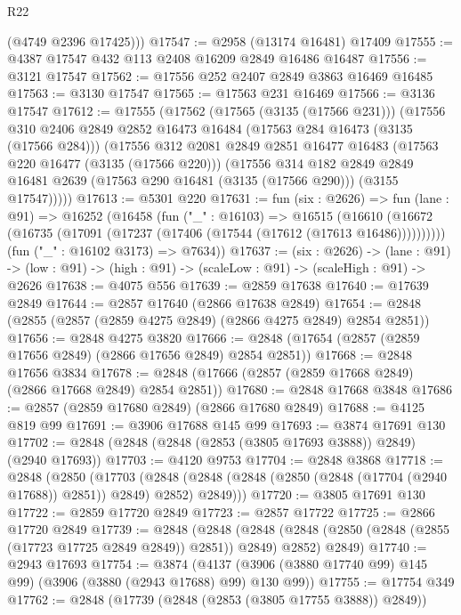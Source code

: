 \begin{lexlean}{R22}
\begin{coremodule}
        (@4749 @2396 @17425)))
@17547 := @2958 (@13174 @16481) @17409
@17555 := @4387 @17547 @432 @113 @2408 @16209 @2849 @16486 @16487
@17556 := @3121 @17547
@17562 := @17556 @252 @2407 @2849 @3863 @16469 @16485
@17563 := @3130 @17547
@17565 := @17563 @231 @16469
@17566 := @3136 @17547
@17612 := @17555
    (@17562
      (@17565 (@3135 (@17566 @231)))
      (@17556
        @310
        @2406
        @2849
        @2852
        @16473
        @16484
        (@17563 @284 @16473 (@3135 (@17566 @284)))
        (@17556
          @312
          @2081
          @2849
          @2851
          @16477
          @16483
          (@17563 @220 @16477 (@3135 (@17566 @220)))
          (@17556
            @314
            @182
            @2849
            @2849
            @16481
            @2639
            (@17563 @290 @16481 (@3135 (@17566 @290)))
            (@3155 @17547)))))
@17613 := @5301 @220
@17631 := fun (six : @2626) =>
  fun (lane : @91) =>
  @16252
    (@16458
      (fun ("_" : @16103) =>
      @16515
        (@16610 (@16672 (@16735 (@17091 (@17237 (@17406 (@17544 (@17612 (@17613 @16486))))))))))
      (fun ("_" : @16102 @3173) => @7634))
@17637 := (six : @2626) ->
  (lane : @91) -> (low : @91) -> (high : @91) -> (scaleLow : @91) -> (scaleHigh : @91) -> @2626
@17638 := @4075 @556
@17639 := @2859 @17638
@17640 := @17639 @2849
@17644 := @2857 @17640 (@2866 @17638 @2849)
@17654 := @2848 (@2855 (@2857 (@2859 @4275 @2849) (@2866 @4275 @2849) @2854 @2851))
@17656 := @2848 @4275 @3820
@17666 := @2848 (@17654 (@2857 (@2859 @17656 @2849) (@2866 @17656 @2849) @2854 @2851))
@17668 := @2848 @17656 @3834
@17678 := @2848 (@17666 (@2857 (@2859 @17668 @2849) (@2866 @17668 @2849) @2854 @2851))
@17680 := @2848 @17668 @3848
@17686 := @2857 (@2859 @17680 @2849) (@2866 @17680 @2849)
@17688 := @4125 @819 @99
@17691 := @3906 @17688 @145 @99
@17693 := @3874 @17691 @130
@17702 := @2848 (@2848 (@2848 (@2853 (@3805 @17693 @3888)) @2849) (@2940 @17693))
@17703 := @4120 @9753
@17704 := @2848 @3868
@17718 := @2848
    (@2850
      (@17703
        (@2848 (@2848 (@2848 (@2850 (@2848 (@17704 (@2940 @17688)) @2851)) @2849) @2852) @2849)))
@17720 := @3805 @17691 @130
@17722 := @2859 @17720 @2849
@17723 := @2857 @17722
@17725 := @2866 @17720 @2849
@17739 := @2848
    (@2848
      (@2848 (@2848 (@2850 (@2848 (@2855 (@17723 @17725 @2849 @2849)) @2851)) @2849) @2852)
      @2849)
@17740 := @2943 @17693
@17754 := @3874
    (@4137 (@3906 (@3880 @17740 @99) @145 @99) (@3906 (@3880 (@2943 @17688) @99) @130 @99))
@17755 := @17754 @349
@17762 := @2848 (@17739 (@2848 (@2853 (@3805 @17755 @3888)) @2849))

\end{coremodule}
\end{lexlean}
